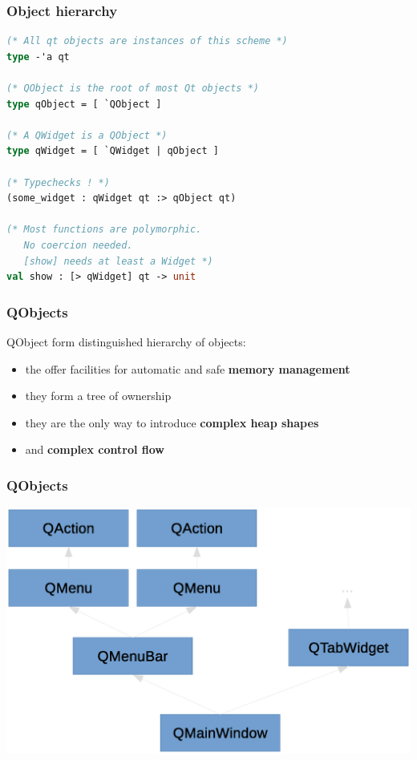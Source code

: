 \documentclass[serif,mathserif]{beamer}
\begin{document}
\begin{frame}[fragile]
  \frametitle{Object hierarchy}

  \begin{lstlisting}[language=Caml,morekeywords={val}]
(* All qt objects are instances of this scheme *)
type -'a qt

(* QObject is the root of most Qt objects *) 
type qObject = [ `QObject ]

(* A QWidget is a QObject *)
type qWidget = [ `QWidget | qObject ]

(* Typechecks ! *)
(some_widget : qWidget qt :> qObject qt)

(* Most functions are polymorphic.
   No coercion needed.
   [show] needs at least a Widget *)
val show : [> qWidget] qt -> unit
  \end{lstlisting}

\end{frame}

\begin{frame}
  \frametitle{QObjects}

  QObject form distinguished hierarchy of objects:
  \begin{itemize}
    \item the offer facilities for automatic and safe {\bf memory management}
    \item they form a tree of ownership 
    \item they are the only way to introduce {\bf complex heap shapes}
    \item and {\bf complex control flow}
  \end{itemize}
\end{frame}

\begin{frame}
  \frametitle{QObjects}

  \includegraphics[scale=0.5]{hierarchy}
\end{frame}
\end{document}
